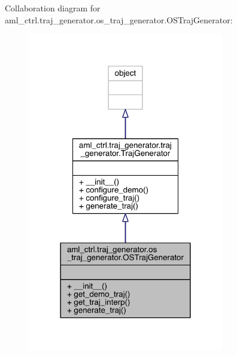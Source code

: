 Collaboration diagram for aml\+\_\+ctrl.\+traj\+\_\+generator.\+os\+\_\+traj\+\_\+generator.\+O\+S\+Traj\+Generator\+:\nopagebreak
\begin{figure}[H]
\begin{center}
\leavevmode
\includegraphics[width=242pt]{classaml__ctrl_1_1traj__generator_1_1os__traj__generator_1_1_o_s_traj_generator__coll__graph}
\end{center}
\end{figure}
